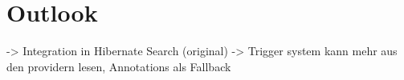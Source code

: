 \section{Outlook}\label{outlook}

-> Integration in Hibernate Search (original)
-> Trigger system kann mehr aus den providern lesen, Annotations als Fallback